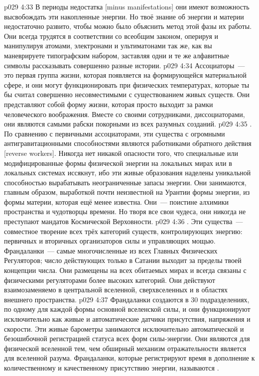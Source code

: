\vs p029 4:33 В периоды недостатка [minus manifestations] они имеют возможность высвобождать эти накопленные энергии. Но твоё знание об энергии и материи недостаточно развито, чтобы можно было объяснить метод этой фазы их работы. Они всегда трудятся в соответствии со всеобщим законом, оперируя и манипулируя атомами, электронами и ультиматонами так же, как вы маневрируете типографским набором, заставляя одни и те же алфавитные символы рассказывать совершенно разные истории.
\vs p029 4:34 Ассоциаторы~--- это первая группа жизни, которая появляется на формирующейся материальной сфере, и они могут функционировать при физических температурах, которые ты бы считал совершенно несовместимыми с существованием живых существ. Они представляют собой форму жизни, которая просто выходит за рамки человеческого воображения. Вместе со своими сотрудниками, диссоциаторами, они являются самыми рабски покорными из всех разумных созданий.
\vs p029 4:35 . По сравнению с первичными ассоциаторами, эти существа с огромными антигравитационными способностями являются работниками обратного действия [reverse workers]. Никогда нет никакой опасности того, что специальные или модифицированные формы физической энергии на локальных мирах или в локальных системах иссякнут, ибо эти живые образования наделены уникальной способностью вырабатывать неограниченные запасы энергии. Они занимаются, главным образом, выработкой почти неизвестной на Урантии формы энергии, из формы материи, которая ещё менее известна. Они~--- поистине алхимики пространства и чудотворцы времени. Но творя все свои чудеса, они никогда не преступают мандатов Космической Верховности.
\vs p029 4:36 . Эти существа~--- совместное творение всех трёх категорий существ, контролирующих энергию: первичных и вторичных организаторов силы и управляющих мощью. Франдаланки~--- самые многочисленные из всех Главных Физических Регуляторов; число действующих только в Сатании выходит за пределы твоей концепции числа. Они размещены на всех обитаемых мирах и всегда связаны с физическими регуляторами более высоких категорий. Они действуют взаимозаменяемо в центральной вселенной, сверхвселенных и в областях внешнего пространства.
\vs p029 4:37 Франдаланки создаются в 30 подразделениях, по одному для каждой формы основной вселенской силы, и они функционируют исключительно как живые и автоматические датчики присутствия, напряжения и скорости. Эти живые барометры занимаются исключительно автоматической и безошибочной регистрацией статуса всех форм силы\hyp{}энергии. Они являются для физической вселенной тем, чем обширный механизм отражательности является для вселенной разума. Франдаланки, которые регистрируют время в дополнение к количественному и качественному присутствию энергии, называются .
